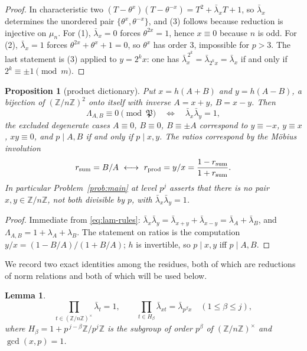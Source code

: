 \documentclass[a4paper]{article}
\newtheorem{lemma}[theorem]{Lemma}
\newtheorem{proposition}[theorem]{Proposition}
\newcommand{\Z}{\mathbb{Z}}
\begin{document}
\begin{proof}
	In characteristic two
	$(T-\theta^{x})(T-\theta^{-x})=T^{2}+\bar\lambda_xT+1$, so
	$\bar\lambda_x$ determines the unordered pair
	$\{\theta^{x},\theta^{-x}\}$, and (3) follows because reduction is
	injective on $\mu_n$.
	For (1), $\bar\lambda_x=0$ forces $\theta^{2x}=1$, hence $x\equiv0$
	because $n$ is odd.
	For (2), $\bar\lambda_x=1$ forces $\theta^{2x}+\theta^{x}+1=0$, so
	$\theta^{x}$ has order $3$, impossible for $p>3$.
	The last statement is (3) applied to $y=2^{k}x$: one has
	$\bar\lambda_x^{\,2^{k}}=\bar\lambda_{2^{k}x}=\bar\lambda_x$ if and only
	if $2^{k}\equiv\pm1\pmod m$.
\end{proof}

\begin{proposition}[product dictionary]\label{prop:product-form}
	Put $x=h(A+B)$ and $y=h(A-B)$, a bijection of $(\Z/n\Z)^2$ onto itself
	with inverse $A=x+y$, $B=x-y$.  Then
	\[
		\Lambda_{A,B}\equiv0\pmod{\mathfrak P}
		\quad\Longleftrightarrow\quad
		\bar\lambda_x\bar\lambda_y=1 ,
	\]
	the excluded degenerate cases $A\equiv0$, $B\equiv0$, $B\equiv\pm A$
	correspond to $y\equiv-x$, $y\equiv x$, $xy\equiv0$, and $p\mid A,B$
	if and only if $p\mid x,y$.
	The ratios correspond by the Möbius involution
	\[
		r_{\rm sum}=B/A\ \longleftrightarrow\
		r_{\rm prod}=y/x=\frac{1-r_{\rm sum}}{1+r_{\rm sum}} .
	\]
	In particular Problem~\ref{prob:main} at level $p^{j}$ asserts that
	there is no pair $x,y\in\Z/n\Z$, not both divisible by $p$, with
	$\bar\lambda_x\bar\lambda_y=1$.
\end{proposition}

\begin{proof}
	Immediate from \eqref{eq:lam-rules}: $\bar\lambda_x\bar\lambda_y
	=\bar\lambda_{x+y}+\bar\lambda_{x-y}=\bar\lambda_A+\bar\lambda_B$,
	and $\Lambda_{A,B}=1+\lambda_A+\lambda_B$.
	The statement on ratios is the computation
	$y/x=(1-B/A)/(1+B/A)$; $h$ is invertible, so $p\mid x,y$ iff
	$p\mid A,B$.
\end{proof}

We record two exact identities among the residues, both of which are
reductions of norm relations and both of which will be used below.

\begin{lemma}\label{lem:lam-relations}
	\[
		\prod_{t\in(\Z/n\Z)^{\times}}\bar\lambda_t=1,
		\qquad
		\prod_{t\in H_\beta}\bar\lambda_{xt}=\bar\lambda_{p^{\beta}x}
		\quad(1\leq\beta\leq j),
	\]
	where $H_\beta=1+p^{\,j-\beta}\Z/p^{j}\Z$ is the subgroup of order
	$p^{\beta}$ of $(\Z/n\Z)^{\times}$ and $\gcd(x,p)=1$.
\end{lemma}
\end{document}
